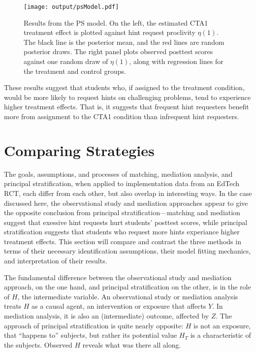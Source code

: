 \documentclass{article}\usepackage[]{graphicx}\usepackage[]{color}
\begin{document}
\begin{figure}
\centering
\texttt{[image: output/psModel.pdf]}
\caption{Results from the PS model. On the left, the estimated
  CTA1 treatment effect is plotted against hint request proclivity
  $\eta(1)$. The black line is the posterior mean, and the red lines
  are random posterior draws. The right panel plots observed posttest
  scores against one random draw of $\eta(1)$, along with regression
  lines for the treatment and control groups.}
\label{fig:psResults}
\end{figure}

These results suggest that students who, if assigned to the treatment
condition, would be more likely to request hints on challenging
problems, tend to experience higher treatment effects.
That is, it suggests that frequent hint requesters benefit more from
assignment to the CTA1 condition than infrequent hint requesters.

\section{Comparing Strategies}\label{sec:synthesis}
The goals, assumptions, and processes of matching, mediation analysis,
and principal stratification, when applied to implementation data from
an EdTech RCT, each differ from each other, but also overlap in
interesting ways.
In the case discussed here, the observational study and mediation
approaches appear to give the opposite conclusion from principal
stratification---matching and mediation suggest that exessive hint
requests hurt students' posttest scores, while principal
stratification suggests that students who request more hints
experiance higher treatment effects.
This section will compare and contrast the three methods in terms of
 their necessary identification assumptions, their model fitting
 mechanics, and interpretation of their results.

The fundamental difference between the observational study and
mediation approach, on the one hand, and principal stratification on
the other, is in the role of $H$, the intermediate variable.
An observational study or mediation analysis treats $H$ as a causal
agent, an intervention or exposure that affects $Y$.
In mediation analysis, it is also an (intermediate) outcome, affected
by $Z$.
The approach of principal stratification is quite nearly opposite:
$H$ is not an exposure, that ``happens to'' subjects, but rather its
potential value $H_T$ is a characteristic of the subjects.
Observed $H$ reveals what was there all along.
\end{document}
